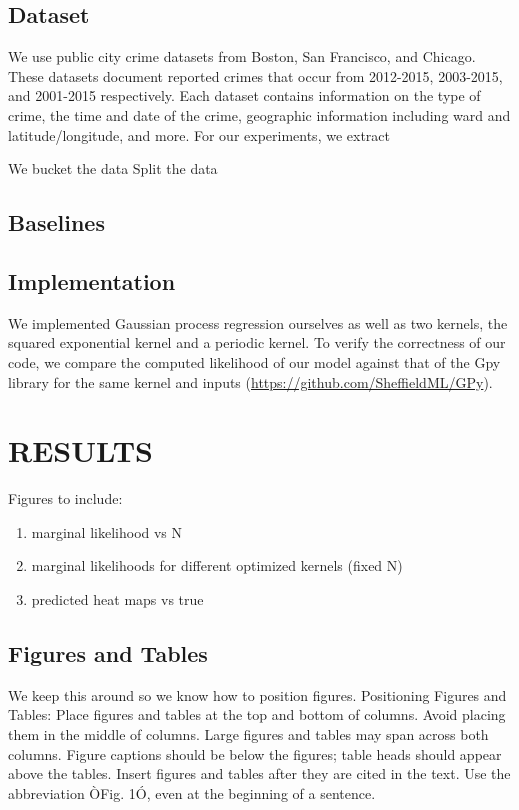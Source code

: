 \documentclass[letterpaper, 12 pt, conference]{ieeeconf}  %
\begin{document}
\subsection{Dataset}

We use public city crime datasets from Boston, San Francisco, and Chicago. These datasets document reported crimes that occur from 2012-2015, 2003-2015, and 2001-2015 respectively. Each dataset contains information on the type of crime, the time and date of the crime, geographic information including ward and latitude/longitude, and more. For our experiments, we extract

We bucket the data
Split the data
\subsection{Baselines}



\subsection{Implementation}

We implemented Gaussian process regression ourselves as well as two kernels, the squared exponential kernel and a periodic kernel. To verify the correctness of our code, we compare the computed likelihood of our model against that of the Gpy library for the same kernel and inputs (\url{https://github.com/SheffieldML/GPy}).

\section{RESULTS}

Figures to include:
\begin{enumerate}
\item marginal likelihood vs N
\item marginal likelihoods for different optimized kernels (fixed N)
\item predicted heat maps vs true
\end{enumerate}

\subsection{Figures and Tables}

We keep this around so we know how to position figures. Positioning Figures and Tables: Place figures and tables at the top and bottom of columns. Avoid placing them in the middle of columns. Large figures and tables may span across both columns. Figure captions should be below the figures; table heads should appear above the tables. Insert figures and tables after they are cited in the text. Use the abbreviation ÒFig. 1Ó, even at the beginning of a sentence.
\end{document}

